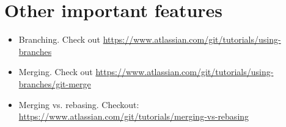 \documentclass{article}
\begin{document}
\section{Other important features}
\begin{itemize}
\item Branching. Check out \href{https://www.atlassian.com/git/tutorials/using-branches}{https://www.atlassian.com/git/tutorials/using-branches}
\item Merging. Check out \href{https://www.atlassian.com/git/tutorials/using-branches/git-merge}{https://www.atlassian.com/git/tutorials/using-branches/git-merge}
\item Merging vs. rebasing. Checkout: \href{https://www.atlassian.com/git/tutorials/merging-vs-rebasing}{https://www.atlassian.com/git/tutorials/merging-vs-rebasing}
\end{itemize}
\end{document}
